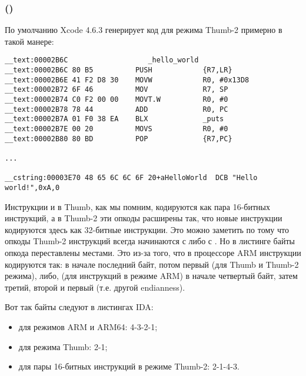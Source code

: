 \subsubsection{\OptimizingXcodeIV (\ThumbTwoMode)}

По умолчанию Xcode 4.6.3 генерирует код для режима Thumb-2 примерно в такой манере:

\begin{lstlisting}[caption=\OptimizingXcodeIV (\ThumbTwoMode)]
__text:00002B6C                   _hello_world
__text:00002B6C 80 B5          PUSH            {R7,LR}
__text:00002B6E 41 F2 D8 30    MOVW            R0, #0x13D8
__text:00002B72 6F 46          MOV             R7, SP
__text:00002B74 C0 F2 00 00    MOVT.W          R0, #0
__text:00002B78 78 44          ADD             R0, PC
__text:00002B7A 01 F0 38 EA    BLX             _puts
__text:00002B7E 00 20          MOVS            R0, #0
__text:00002B80 80 BD          POP             {R7,PC}

...

__cstring:00003E70 48 65 6C 6C 6F 20+aHelloWorld  DCB "Hello world!",0xA,0
\end{lstlisting}


\myindex{\ThumbTwoMode}
Инструкции  и  в Thumb, как мы помним, кодируются как пара 16-битных инструкций, 
а в Thumb-2 эти  опкоды расширены так, что новые инструкции кодируются здесь как 
32-битные инструкции.
Это можно заметить по тому что опкоды Thumb-2 инструкций всегда начинаются с  либо с .
Но в листинге \IDA байты опкода переставлены местами.
Это из-за того, что в процессоре ARM инструкции кодируются так:
в начале последний байт, потом первый (для Thumb и Thumb-2 режима), либо, 
(для инструкций в режиме ARM) в начале четвертый байт, затем третий, второй и первый 
(т.е. другой \gls{endianness}).

Вот так байты следуют в листингах IDA:

\begin{itemize}
\item для режимов ARM и ARM64: 4-3-2-1;
\item для режима Thumb: 2-1;
\item для пары 16-битных инструкций в режиме Thumb-2: 2-1-4-3.
\end{itemize}

